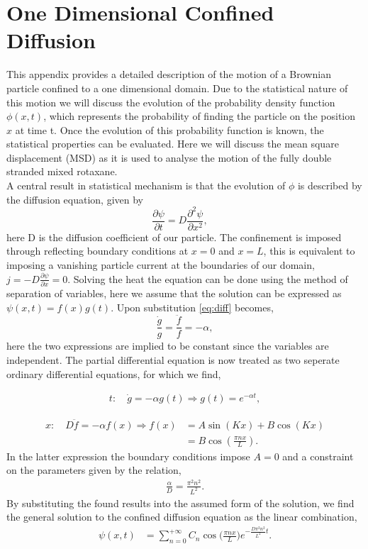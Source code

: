 \chapter{One Dimensional Confined Diffusion}

This appendix provides a detailed description of the motion of a Brownian particle
confined to a one dimensional domain. Due to the statistical nature of this motion we
will discuss the evolution of the probability density function $\phi(x,t)$, which
represents the probability of finding the particle on the position $x$ at time t.
Once the evolution of this probability function is known, the statistical properties can
be evaluated. Here we will discuss the mean square displacement (MSD) as it is used to
analyse the motion of the fully double stranded mixed rotaxane.\\
A central result in statistical mechanism is that the evolution of
$\phi$ is  described by the diffusion equation, given by
\begin{equation}
  \frac{\partial \psi}{\partial t} =  D \frac{\partial^2 \psi}{\partial x^2}, \quad
  \label{eq:diff}
\end{equation}
here D is the diffusion coefficient of our particle.
The confinement is imposed through reflecting boundary conditions at $x=0$ and $x=L$,
this is equivalent to imposing a
vanishing particle current at the boundaries of our domain, $j = - D \frac{\partial
\psi}{\partial x} = 0$. Solving the heat the equation can be done using the method of
separation of variables, here we assume that the solution can be expressed as $ \psi(x,t)
= f(x)g(t)$. Upon substitution \ref{eq:diff} becomes,
\begin{equation}
  \frac{\dot{g}}{g} = \frac{\ddot{f}}{f} = - \alpha,
\end{equation}
here the two expressions are implied to be constant since the variables are independent.
The partial differential equation is now treated as two seperate ordinary differential
equations, for which we find,

\begin{align}
t:\quad \dot{g} = - \alpha g(t) \Rightarrow g(t) = e^{-\alpha t},
\end{align}

\begin{align}
  x:\quad D \ddot{f} = - \alpha f(x) \Rightarrow f(x) &= A \sin(K x) + B \cos(Kx)\\
  &= B \cos(\frac{\pi n x}{L}).
\end{align}
In the latter expression the boundary conditions impose $A=0$ and a constraint on the
parameters given by the relation,
\begin{align}
  \frac{\alpha}{D} = \frac{\pi^2 n^2}{L^2}.
\end{align}
By substituting the found results into the assumed form of the solution, we find the
general solution to the confined diffusion equation as the linear combination,
\begin{align}
  \psi(x,t) &= \sum_{n=0}^{+\infty} C_n \cos\Big(\frac{\pi n x}{L}\Big) e^{- \frac{D\pi^2
  n^2}{L^2}t}.
\end{align}

